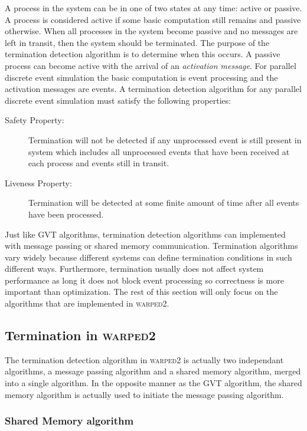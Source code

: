 \documentclass[11pt]{book}
\begin{document}
A process in the system can be in one of two states at any time: active or passive. A process
is considered active if some basic computation still remains and passive otherwise.
When all processes in the system become passive and no messages are left in transit, then
the system should be terminated. The purpose of the termination detection algorithm is to
determine when this occurs. A passive process can become active with the arrival of an
\emph{activation message}. For parallel discrete event simulation the basic computation is
event processing and the activation messages are events. A termination detection algorithm for
any parallel discrete event simulation must satisfy the following properties:

\begin{description}
    \item[Safety Property:] Termination will not be detected if any unprocessed event is still
        present in system which includes all unprocessed events that have been received at each
        process and events still in transit.
    \item[Liveness Property:] Termination will be detected at some finite amount of time after
        all events have been processed.
\end{description}

Just like GVT algorithms, termination detection algorithms can implemented with message
passing or shared memory communication. Termination algorithms vary widely because different
systems can define termination conditions in such different ways. Furthermore, termination
usually does not affect system performance as long it does not block event processing so
correctness is more important than optimization. The rest of this section will only focus
on the algorithms that are implemented in \textsc{warped2}.

\subsection{Termination in \textsc{warped2}}

The termination detection algorithm in \textsc{warped2} is actually two independant algorithms,
a message passing algorithm and a shared memory algorithm, merged into a single algorithm. In
the opposite manner as the GVT algorithm, the shared memory algorithm is actually used to initiate
the message passing algorithm.

\subsubsection{Shared Memory algorithm}
\end{document}
